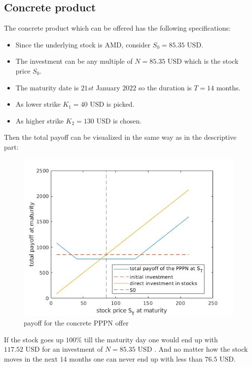 \documentclass[11pt,oneside,a4paper]{article}
\begin{document}
	\subsection{Concrete product}
	The concrete product which can be offered has the following specifications:
	\begin{itemize}
		\item Since the underlying stock is AMD, consider $ S_0 = 85.35 \text{ USD} $.
		\item The investment can be any multiple of $ N = 85.35 \text{ USD} $ which is the stock price $ S_0 $.
		\item The maturity date is $ 21st $ January $ 2022 $ so the duration is $ T = 14 $ months.
		\item As lower strike $ K_1 = 40 \text{ USD} $ is picked.
		\item As higher strike $ K_2 = 130 \text{ USD} $ is chosen.
	\end{itemize}
	Then the total payoff can be visualized in the same way as in the descriptive part:
	\begin{figure}[H]
		\centering
		\includegraphics[width=0.8\linewidth]{PPPN_concrete.jpg}
		\caption{payoff for the concrete PPPN offer}
	\end{figure} 
	If the stock goes up $ 100 \% $ till the maturity day one would end up with $ 117.52 \text{ USD}$ for an investment of  $ N = 85.35 \text{ USD} $ . And no matter how the stock moves in the next $ 14 $ months one can never end up with less than $ 76.5 \text{ USD} $.
	\newpage
\end{document}
